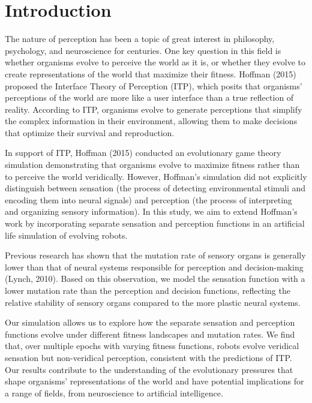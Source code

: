 \documentclass{article}[10pt]
\begin{document}
\tableofcontents

\newpage
\section{Introduction}

The nature of perception has been a topic of great interest in philosophy, psychology, and neuroscience for centuries. 
One key question in this field is whether organisms evolve to perceive the world as it is, or whether they evolve to create representations of the world that maximize their fitness. 
Hoffman (2015) proposed the Interface Theory of Perception (ITP), which posits that organisms' perceptions of the world are more like a user interface than a true reflection of reality. 
According to ITP, organisms evolve to generate perceptions that simplify the complex information in their environment, allowing them to make decisions that optimize their survival and reproduction.

In support of ITP, Hoffman (2015) conducted an evolutionary game theory simulation demonstrating that organisms evolve to maximize fitness rather than to perceive the world veridically. 
However, Hoffman's simulation did not explicitly distinguish between sensation (the process of detecting environmental stimuli and encoding them into neural signals) and perception (the process of interpreting and organizing sensory information). 
In this study, we aim to extend Hoffman's work by incorporating separate sensation and perception functions in an artificial life simulation of evolving robots.\par

Previous research has shown that the mutation rate of sensory organs is generally lower than that of neural systems responsible for perception and decision-making (Lynch, 2010). 
Based on this observation, we model the sensation function with a lower mutation rate than the perception and decision functions, reflecting the relative stability of sensory organs compared to the more plastic neural systems.\par

Our simulation allows us to explore how the separate sensation and perception functions evolve under different fitness landscapes and mutation rates. 
We find that, over multiple epochs with varying fitness functions, robots evolve veridical sensation but non-veridical perception, consistent with the predictions of ITP. 
Our results contribute to the understanding of the evolutionary pressures that shape organisms' representations of the world and have potential implications for a range of fields, from neuroscience to artificial intelligence.\par
\end{document}
